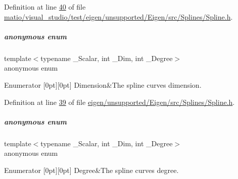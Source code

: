 Definition at line \hyperlink{matio_2visual__studio_2test_2eigen_2unsupported_2_eigen_2src_2_splines_2_spline_8h_source_l00040}{40} of file \hyperlink{matio_2visual__studio_2test_2eigen_2unsupported_2_eigen_2src_2_splines_2_spline_8h_source}{matio/visual\+\_\+studio/test/eigen/unsupported/\+Eigen/src/\+Splines/\+Spline.\+h}.

\mbox{\label{group___splines___module_ac6e6f78d4fdd617480025c62a2747fd6}} 
\subparagraph{\texorpdfstring{anonymous enum}{anonymous enum}}
{\footnotesize\ttfamily template$<$typename \+\_\+\+Scalar, int \+\_\+\+Dim, int \+\_\+\+Degree$>$ \\
anonymous enum}

\begin{DoxyEnumFields}{Enumerator}
[0pt][0pt]{}\mbox{\label{group___splines___module_a82c233f1d4719bc52397d64a6c96c5b0a25366e5e79da5355d259a71096d8d8a7}} 
Dimension&The spline curve\textquotesingle{}s dimension. \\
\hline

\end{DoxyEnumFields}


Definition at line \hyperlink{eigen_2unsupported_2_eigen_2src_2_splines_2_spline_8h_source_l00039}{39} of file \hyperlink{eigen_2unsupported_2_eigen_2src_2_splines_2_spline_8h_source}{eigen/unsupported/\+Eigen/src/\+Splines/\+Spline.\+h}.

\mbox{\label{group___splines___module_a31dabd24bcf898ce4686687d0d647b10}} 
\subparagraph{\texorpdfstring{anonymous enum}{anonymous enum}}
{\footnotesize\ttfamily template$<$typename \+\_\+\+Scalar, int \+\_\+\+Dim, int \+\_\+\+Degree$>$ \\
anonymous enum}

\begin{DoxyEnumFields}{Enumerator}
[0pt][0pt]{}\mbox{\label{group___splines___module_a40cd07294408f87d39763e15b331b4d1a7bc38582fb1bae7db67c89b6c5f45f24}} 
Degree&The spline curve\textquotesingle{}s degree. \\
\hline

\end{DoxyEnumFields}


